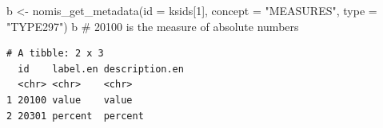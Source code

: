 \documentclass[
  letterpaper,
  DIV=11,
  numbers=noendperiod]{scrreprt}
\newenvironment{Shaded}{\begin{snugshade}}{\end{snugshade}}
\newcommand{\AttributeTok}[1]{\textcolor[rgb]{0.40,0.45,0.13}{#1}}
\newcommand{\CommentTok}[1]{\textcolor[rgb]{0.37,0.37,0.37}{#1}}
\newcommand{\DecValTok}[1]{\textcolor[rgb]{0.68,0.00,0.00}{#1}}
\newcommand{\FunctionTok}[1]{\textcolor[rgb]{0.28,0.35,0.67}{#1}}
\newcommand{\NormalTok}[1]{\textcolor[rgb]{0.00,0.23,0.31}{#1}}
\newcommand{\OtherTok}[1]{\textcolor[rgb]{0.00,0.23,0.31}{#1}}
\newcommand{\StringTok}[1]{\textcolor[rgb]{0.13,0.47,0.30}{#1}}
\begin{document}
\begin{Shaded}
\begin{Highlighting}[]
\NormalTok{b }\OtherTok{\textless{}{-}} \FunctionTok{nomis\_get\_metadata}\NormalTok{(}\AttributeTok{id =}\NormalTok{ ksids[}\DecValTok{1}\NormalTok{], }\AttributeTok{concept =} \StringTok{"MEASURES"}\NormalTok{, }\AttributeTok{type =} \StringTok{"TYPE297"}\NormalTok{)}
\NormalTok{b }\CommentTok{\# 20100 is the measure of absolute numbers}
\end{Highlighting}
\end{Shaded}

\begin{verbatim}
# A tibble: 2 x 3
  id    label.en description.en
  <chr> <chr>    <chr>         
1 20100 value    value         
2 20301 percent  percent       
\end{verbatim}
\end{document}

